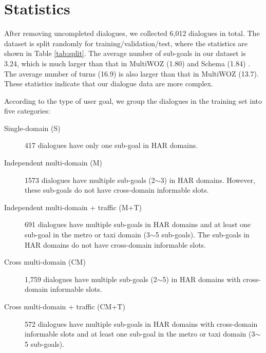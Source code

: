 \section{Statistics}
\label{sec:statistics}
After removing uncompleted dialogues, we collected 6,012 dialogues in total. The dataset is split randomly for training/validation/test, where the statistics are shown in Table \ref{tab:split}. The average number of sub-goals in our dataset is 3.24, which is much larger than that in MultiWOZ (1.80) \cite{Multiwoz2018} and Schema (1.84) \cite{SchemaGuided}. The average number of turns (16.9) is also larger than that in MultiWOZ (13.7). These statistics indicate that our dialogue data are more complex. 

According to the type of user goal, we group the dialogues in the training set into five categories:
\begin{description}
    \item[Single-domain (S)] 417 dialogues have only one sub-goal in HAR domains.
    
    \item[Independent multi-domain (M)] 1573 dialogues have multiple sub-goals (2$\sim$3) in HAR domains. However, these sub-goals do not have cross-domain informable slots.
    
    \item[Independent multi-domain + traffic (M+T)] 691 dialogues have multiple sub-goals in HAR domains and at least one sub-goal in the metro or taxi domain (3$\sim$5 sub-goals). The sub-goals in HAR domains do not have cross-domain informable slots.
    
    \item[Cross multi-domain (CM)] 1,759 dialogues have multiple sub-goals (2$\sim$5) in HAR domains with cross-domain informable slots. 
    
    \item[Cross multi-domain + traffic (CM+T)] 572 dialogues have multiple sub-goals in HAR domains with cross-domain informable slots and at least one sub-goal in the metro or taxi domain (3$\sim$5 sub-goals). 
\end{description}


